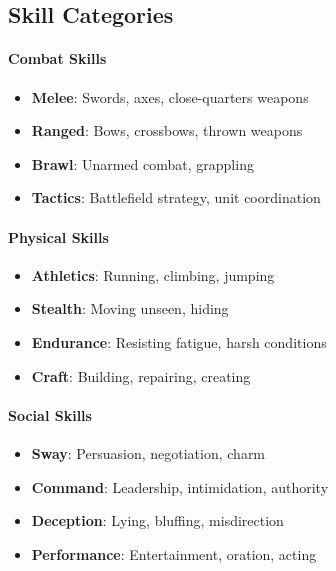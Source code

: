 \subsection*{Skill Categories}

\paragraph{Combat Skills}
\begin{itemize}
\item \textbf{Melee}: Swords, axes, close-quarters weapons
\item \textbf{Ranged}: Bows, crossbows, thrown weapons
\item \textbf{Brawl}: Unarmed combat, grappling
\item \textbf{Tactics}: Battlefield strategy, unit coordination
\end{itemize}

\paragraph{Physical Skills}
\begin{itemize}
\item \textbf{Athletics}: Running, climbing, jumping
\item \textbf{Stealth}: Moving unseen, hiding
\item \textbf{Endurance}: Resisting fatigue, harsh conditions
\item \textbf{Craft}: Building, repairing, creating
\end{itemize}

\paragraph{Social Skills}
\begin{itemize}
\item \textbf{Sway}: Persuasion, negotiation, charm
\item \textbf{Command}: Leadership, intimidation, authority
\item \textbf{Deception}: Lying, bluffing, misdirection
\item \textbf{Performance}: Entertainment, oration, acting
\end{itemize}

